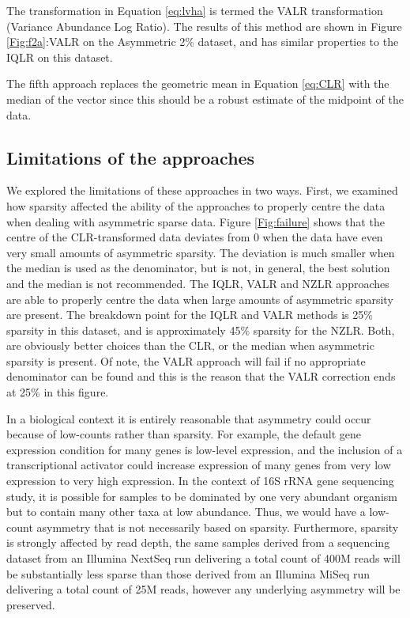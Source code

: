 \documentclass{bmcart}
\begin{document}
 
The transformation in Equation \ref{eq:lvha} is termed the VALR transformation (Variance Abundance Log Ratio). The results of this method are shown in Figure \ref{Fig:f2a}:VALR on the Asymmetric 2\% dataset, and has similar properties to the IQLR on this dataset. 

The fifth approach replaces the geometric mean in Equation \ref{eq:CLR} with the  median of the vector since this should be a robust estimate of the midpoint of the data. 

\subsection*{Limitations of the approaches}

We  explored the limitations of these approaches in two ways. First, we examined how  sparsity affected the ability of the approaches to properly centre the data when dealing with asymmetric sparse data. Figure \ref{Fig:failure} shows that the centre of the CLR-transformed data deviates from 0 when the data have even very small amounts of asymmetric sparsity. The deviation is much smaller when the median is used as the denominator, but is not, in general, the best solution and the median is not recommended. The IQLR, VALR and NZLR approaches are able to properly centre the data when large amounts of asymmetric sparsity are present. The breakdown point for the IQLR and VALR methods is 25\% sparsity in this dataset, and is approximately  45\% sparsity for the NZLR. Both, are obviously better choices than the CLR, or the median when asymmetric sparsity is present. Of note, the VALR approach will fail if no appropriate denominator can be found and this is the reason that the VALR correction ends at 25\% in this figure. 

In a biological context it is entirely reasonable that asymmetry could occur because of low-counts  rather than sparsity. For example, the default gene expression condition for many genes is low-level expression, and the inclusion of a transcriptional activator could increase expression of many genes from very low expression to very high expression. In the context of 16S rRNA gene sequencing study, it is possible for samples to be dominated by one very abundant organism but to contain many other taxa at low abundance. Thus, we would have a low-count asymmetry that is not necessarily based on sparsity. Furthermore, sparsity is strongly affected by read depth, the same samples derived from a sequencing dataset from an Illumina NextSeq run delivering a total count of 400M reads will be substantially less sparse than those derived from an Illumina MiSeq run delivering a total count of 25M reads, however any underlying asymmetry will be preserved.
\end{document}
